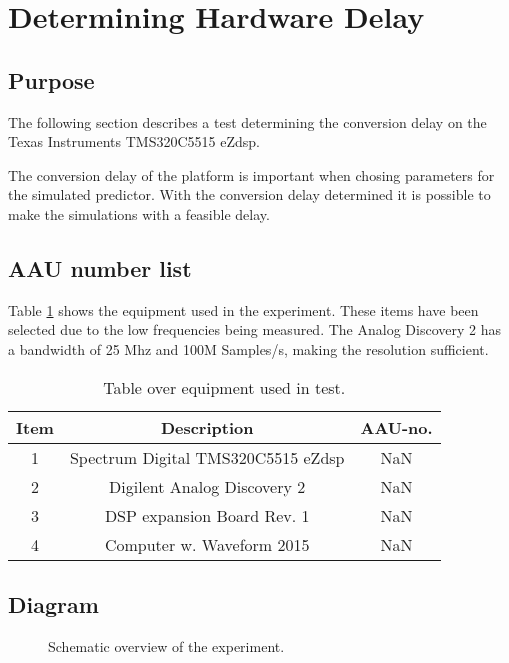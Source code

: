 \section{Determining Hardware Delay} \label{sec:HardwareDelay}

\subsection{Purpose}
The following section describes a test determining the conversion delay on the Texas Instruments TMS320C5515 eZdsp.

The conversion delay of the platform is important when chosing parameters for the simulated predictor. With the conversion delay determined it is possible to  make the simulations with a feasible delay. 

\subsection{AAU number list}
Table \ref{tab:MeasDelayTable} shows the equipment used in the experiment. These items have been selected due to the low frequencies being measured. The Analog Discovery 2 has a bandwidth of 25 Mhz and 100M Samples/s, making the resolution sufficient.  
\begin{table}[H]
	\centering
	\begin{tabular}{ c c c } \toprule
		{Item}	& {Description} 						& {AAU-no}. \\ \bottomrule 
		1	&	Spectrum Digital TMS320C5515 eZdsp	& NaN	\\
		2	&	Digilent Analog Discovery 2	& NaN		\\
		3	&	DSP expansion Board Rev. 1 & NaN		\\
		4	&	Computer w. Waveform 2015					& NaN		\\
		\bottomrule
	\end{tabular}
	\caption{Table over equipment used in test.}
	\label{tab:MeasDelayTable}
\end{table}

\subsection{Diagram}

\begin{figure}[H]
	\centering
	
	\caption{Schematic overview of the experiment.}
	\label{fig:SchematicDelayExperiment}
\end{figure}

